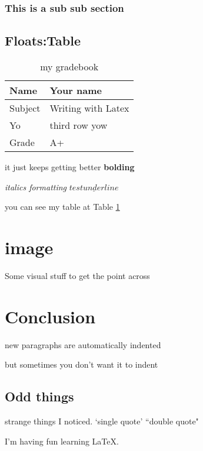\documentclass{article}
\begin{document}
\subsubsection{This is a sub sub section}

\subsection{Floats:Table}

\begin{table}[htbp]
	\caption{my gradebook}
	\begin{center}
		\begin{tabular}{|l|l|}
			\hline
			Name    & Your name          \\
			\hline
			Subject & Writing with Latex \\
			\hline
			Yo      & third row yow      \\
			\hline
			Grade   & A+                 \\
			\hline
		\end{tabular}
	\end{center}
	\label{tab:grades}
\end{table}

it just keeps getting better \textbf{bolding}

\emph{italics formatting}
$\underline{test underline}$

you can see my table at Table \ref{tab:grades}

\section{image}

Some visual stuff to get the point across

\section{Conclusion}

new paragraphs are automatically indented

\noindent but sometimes you don't want it to indent

\subsection{Odd things}

strange things I noticed. `single quote' ``double quote"

I'm having fun learning \LaTeX.
\end{document}
